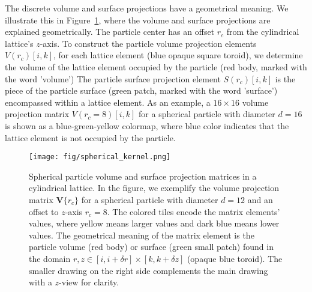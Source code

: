 \documentclass[10pt, a4paper]{article}
\begin{document}
\begin{multicols}{2}
The discrete volume and surface projections have a geometrical meaning.
We illustrate this in Figure~\ref{fig:spherical_kernel}, where the volume and surface projections are explained geometrically.
The particle center has an offset $r_c$ from the cylindrical lattice's $z$-axis.
To construct the particle volume projection elements $V(r_c)[i, k]$, for each lattice element (blue opaque square toroid), we determine the volume of the lattice element occupied by the particle (red body, marked with the word 'volume')
The particle surface projection element $S(r_c)[i, k]$ is the piece of the particle surface (green patch, marked with the word 'surface') encompassed within a lattice element.
As an example, a $16 \times 16$ volume projection matrix $V(r_c = 8)[i, k]$ for a spherical particle with diameter $d = 16$ is shown as a blue-green-yellow colormap, where blue color indicates that the lattice element is not occupied by the particle.

\begin{figure}[H]
    \centering
    \texttt{[image: fig/spherical\_kernel.png]}
    \caption{
        Spherical particle volume and surface projection matrices in a cylindrical lattice.
        In the figure, we exemplify the volume projection matrix $\bm{V}\{r_c\}$ for a spherical particle with diameter $d = 12$ and an offset to $z$-axis $r_c= 8$.
        The colored tiles encode the matrix elements' values, where yellow means larger values and dark blue means lower values.
        The geometrical meaning of the matrix element is the particle volume (red body) or surface (green small patch) found in the domain $r,z \in [i, i + \delta r] \times [k, k + \delta z]$ (opaque blue toroid).
        The smaller drawing on the right side complements the main drawing with a $z$-view for clarity.
    }
    \label{fig:spherical_kernel}
\end{figure}

\end{multicols}
\end{document}
